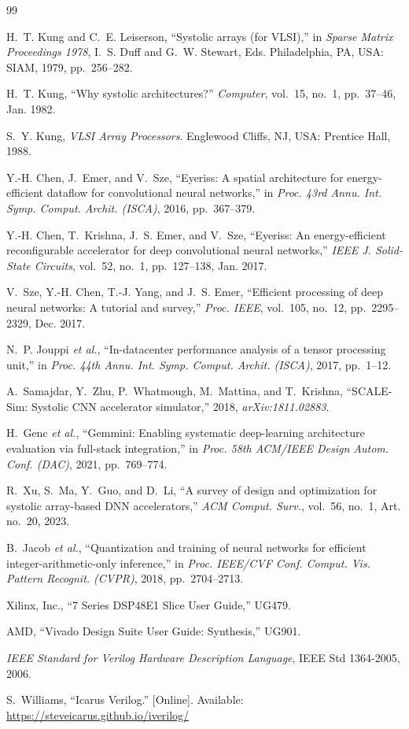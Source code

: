 \documentclass[conference]{IEEEtran}
\begin{document}
\begin{thebibliography}{99}

H.~T. Kung and C.~E. Leiserson, ``Systolic arrays (for VLSI),'' in
\emph{Sparse Matrix Proceedings 1978}, I.~S. Duff and G.~W. Stewart, Eds.
Philadelphia, PA, USA: SIAM, 1979, pp.~256--282.

H.~T. Kung, ``Why systolic architectures?'' \emph{Computer}, vol.~15, no.~1,
pp.~37--46, Jan. 1982.

S.~Y. Kung, \emph{VLSI Array Processors}. Englewood Cliffs, NJ, USA:
Prentice Hall, 1988.

Y.-H. Chen, J.~Emer, and V.~Sze, ``Eyeriss: A spatial architecture for
energy-efficient dataflow for convolutional neural networks,'' in \emph{Proc.
43rd Annu. Int. Symp. Comput. Archit. (ISCA)}, 2016, pp.~367--379.

Y.-H. Chen, T.~Krishna, J.~S. Emer, and V.~Sze, ``Eyeriss: An energy-efficient
reconfigurable accelerator for deep convolutional neural networks,''
\emph{IEEE J. Solid-State Circuits}, vol.~52, no.~1, pp.~127--138, Jan. 2017.

V.~Sze, Y.-H. Chen, T.-J. Yang, and J.~S. Emer, ``Efficient processing of deep
neural networks: A tutorial and survey,'' \emph{Proc. IEEE}, vol.~105,
no.~12, pp.~2295--2329, Dec. 2017.

N.~P. Jouppi \emph{et al.}, ``In-datacenter performance analysis of a tensor
processing unit,'' in \emph{Proc. 44th Annu. Int. Symp. Comput. Archit.
(ISCA)}, 2017, pp.~1--12.

A.~Samajdar, Y.~Zhu, P.~Whatmough, M.~Mattina, and T.~Krishna, ``SCALE-Sim:
Systolic CNN accelerator simulator,'' 2018, \emph{arXiv:1811.02883}.

H.~Genc \emph{et al.}, ``Gemmini: Enabling systematic deep-learning
architecture evaluation via full-stack integration,'' in \emph{Proc. 58th
ACM/IEEE Design Autom. Conf. (DAC)}, 2021, pp.~769--774.

R.~Xu, S.~Ma, Y.~Guo, and D.~Li, ``A survey of design and optimization for
systolic array-based DNN accelerators,'' \emph{ACM Comput. Surv.}, vol.~56,
no.~1, Art. no.~20, 2023.

B.~Jacob \emph{et al.}, ``Quantization and training of neural networks for
efficient integer-arithmetic-only inference,'' in \emph{Proc. IEEE/CVF Conf.
Comput. Vis. Pattern Recognit. (CVPR)}, 2018, pp.~2704--2713.

Xilinx, Inc., ``7 Series DSP48E1 Slice User Guide,'' UG479.

AMD, ``Vivado Design Suite User Guide: Synthesis,'' UG901.

\emph{IEEE Standard for Verilog Hardware Description Language}, IEEE Std
1364-2005, 2006.

S.~Williams, ``Icarus Verilog.'' [Online]. Available:
\url{https://steveicarus.github.io/iverilog/}

\end{thebibliography}
\end{document}
